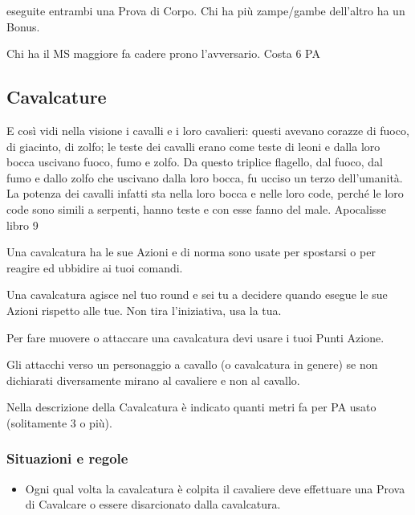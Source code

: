 \documentclass[12pt,a4paper,twoside,openany]{book}
\begin{document}
\begin{multicols}{2}
eseguite entrambi una Prova di Corpo. Chi ha più zampe/gambe dell'altro ha un Bonus.

Chi ha il MS maggiore fa cadere prono l'avversario. Costa 6 PA

\subsection{Cavalcature}\label{cavalcature}

\begin{changemargin}{0.3cm}{0.3cm}\begin{enfasi}{
E così vidi nella visione i cavalli e i loro cavalieri: questi avevano corazze di fuoco, di giacinto, di zolfo; le teste dei cavalli erano come teste di leoni e dalla loro bocca uscivano fuoco, fumo e zolfo. Da questo triplice flagello, dal fuoco, dal fumo e dallo zolfo che uscivano dalla loro bocca, fu ucciso un terzo dell’umanità. La potenza dei cavalli infatti sta nella loro bocca e nelle loro code, perché le loro code sono simili a serpenti, hanno teste e con esse fanno del male. Apocalisse libro 9}\end{enfasi}\end{changemargin}\medskip

Una cavalcatura ha le sue Azioni e di norma sono usate per spostarsi o per reagire ed ubbidire ai tuoi comandi.

Una cavalcatura agisce nel tuo round e sei tu a decidere quando esegue le sue Azioni rispetto alle tue. Non tira l'iniziativa, usa la tua.

Per fare muovere o attaccare una cavalcatura devi usare i tuoi Punti Azione.

Gli attacchi verso un personaggio a cavallo (o cavalcatura in genere) se non dichiarati diversamente mirano al cavaliere e non al cavallo.

Nella descrizione della Cavalcatura è indicato quanti metri fa per PA usato (solitamente 3 o più).

\subsubsection{Situazioni e regole}\label{cavallosituazioniregole}

\begin{itemize}
\item
Ogni qual volta la cavalcatura è colpita il cavaliere deve effettuare una Prova di Cavalcare o essere disarcionato dalla cavalcatura.


\end{itemize}
\end{multicols}
\end{document}
